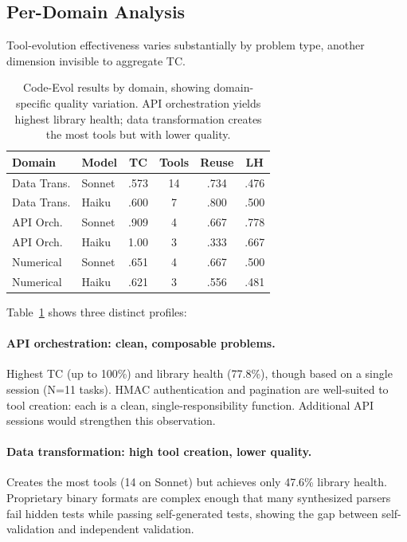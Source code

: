 \documentclass[sigplan,nonacm,natbib=false]{acmart}
\begin{document}
\subsection{Per-Domain Analysis}
\label{sec:domain_analysis}

Tool-evolution effectiveness varies substantially by problem type, another dimension invisible to aggregate TC.

\begin{table}[t]
\centering
\footnotesize
\begin{tabular}{llcccc}
\toprule
\textbf{Domain} & \textbf{Model} & \textbf{TC} & \textbf{Tools} & \textbf{Reuse} & \textbf{LH} \\
\midrule
Data Trans. & Sonnet & .573 & 14 & .734 & .476 \\
Data Trans. & Haiku & .600 & 7 & .800 & .500 \\
\midrule
API Orch. & Sonnet & .909 & 4 & .667 & .778 \\
API Orch. & Haiku & 1.00 & 3 & .333 & .667 \\
\midrule
Numerical & Sonnet & .651 & 4 & .667 & .500 \\
Numerical & Haiku & .621 & 3 & .556 & .481 \\
\bottomrule
\end{tabular}
\caption{Code-Evol results by domain, showing domain-specific quality variation. API orchestration yields highest library health; data transformation creates the most tools but with lower quality.}
\label{tab:domain}
\end{table}

Table~\ref{tab:domain} shows three distinct profiles:

\paragraph{API orchestration: clean, composable problems.} Highest TC (up to 100\%) and library health (77.8\%), though based on a single session (N=11 tasks). HMAC authentication and pagination are well-suited to tool creation: each is a clean, single-responsibility function. Additional API sessions would strengthen this observation.

\paragraph{Data transformation: high tool creation, lower quality.} Creates the most tools (14 on Sonnet) but achieves only 47.6\% library health. Proprietary binary formats are complex enough that many synthesized parsers fail hidden tests while passing self-generated tests, showing the gap between self-validation and independent validation.
\end{document}
